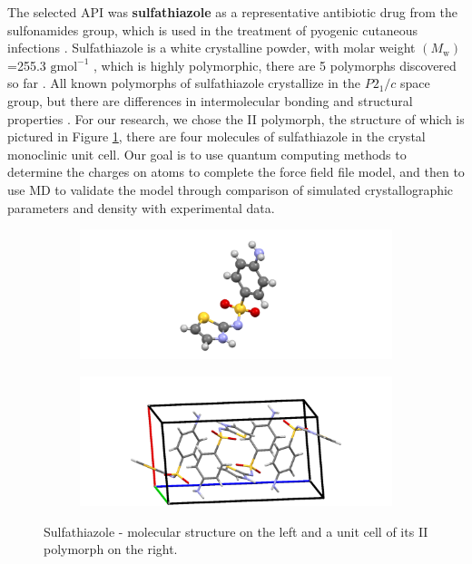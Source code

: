 
    The selected API was \textbf{sulfathiazole} as a representative antibiotic drug from the sulfonamides group, which is used in the treatment of pyogenic cutaneous infections \cite{sulfathiazole_usage}. Sulfathiazole is a white crystalline powder, with molar weight $(M_\mathrm{w})$ =255.3 $\mathrm{gmol^{-1}}$ \cite{sulfathiazole}, which is highly polymorphic, there are 5 polymorphs discovered so far \cite{caron}. All known polymorphs of sulfathiazole crystallize in the $P2_1/c$ space group, but there are differences in intermolecular bonding and structural properties \cite{sulfathiazole_exp}. For our research, we chose the II polymorph, the structure of which is pictured in Figure \ref{fig:sulfathiazole}, there are four molecules of sulfathiazole in the crystal monoclinic unit cell. Our goal is to use quantum computing methods to determine the charges on atoms to complete the force field file model, and then to use MD to validate the model through comparison of simulated crystallographic parameters and density with experimental data.

    \begin{figure}[htb!]
	\begin{subfigure}{0.5\textwidth}
		\includegraphics[width=1.2\linewidth]{img/sulfathiazol.png} 
	\end{subfigure}
	\begin{subfigure}{0.5\textwidth}
		\includegraphics[width=1.1\linewidth]{img/sulfathiazol_packing.png}
	\end{subfigure}
	\caption{Sulfathiazole - molecular structure on the left and a unit cell of its II polymorph on the right.}
	\label{fig:sulfathiazole}
\end{figure}
